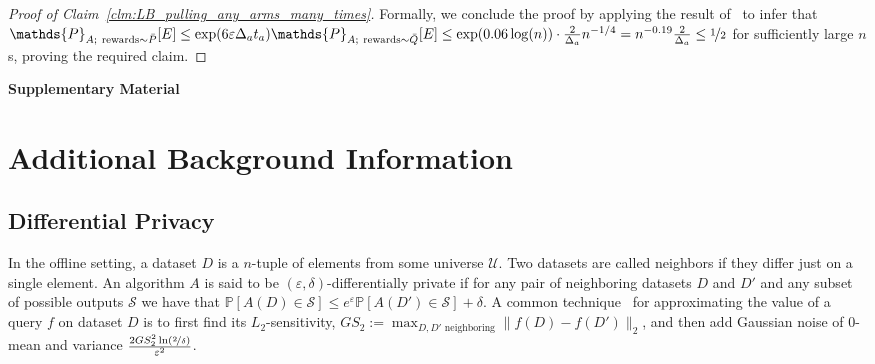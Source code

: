 \documentclass{article}
\renewcommand{\Pr}{\mathds{P}}
\begin{document}
\begin{proof}[Proof of Claim~\ref{clm:LB_pulling_any_arms_many_times}]
Formally, we conclude the proof by applying the result
of~\cite{KarwaVadhanFiniteSampleDP2017} to infer that $\Pr_{A;~{\rm
    rewards}\sim \bar P}[E] \leq \exp(6\varepsilon\Delta_a
t_a)\Pr_{A;~{\rm rewards}\sim \bar Q}[E] \leq \exp(0.06 \log(n)) \cdot
\tfrac 2{\Delta_a}n^{-1/4} = n^{-0.19}\tfrac 2{\Delta_a} \leq \nicefrac 1
2$ for sufficiently large $n$s, proving the required claim.
\end{proof}




\newpage

{\small}


\cleardoublepage
\appendix
{}
{}
\begin{center}
  \LARGE\bf Supplementary Material
\end{center}


\section{Additional Background Information}
\label{apx_sec:more_background}

\subsection{Differential Privacy}
\label{apx_subsec:DP}

In the offline setting, a dataset $D$ is a $n$-tuple of elements from some universe $\mathcal{U}$. Two datasets are called neighbors if they differ just on a single element. An algorithm $A$ is said to be $(\varepsilon,\delta)$-differentially private if for any pair of neighboring datasets $D$ and $D'$ and any subset of possible outputs $\mathcal{S}$ we have that $\Pr[A(D)\in\mathcal{S}]\leq e^\varepsilon\Pr[A(D')\in\mathcal{S}] + \delta$. A common technique~\cite{DworkOurData2006} for approximating the value of a query $f$ on dataset $D$ is to first find its $L_2$-sensitivity, $GS_2 :=\max_{D,D'\textrm{ neighboring}} \|f(D)-f(D')\|_2$, and then add Gaussian noise of $0$-mean and variance $\tfrac{2GS_2^2\ln(\nicefrac 2 \delta)}{\varepsilon^2}$.
\end{document}
